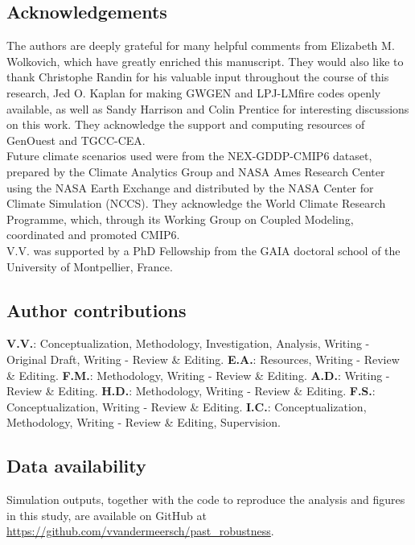 \clearpage

\subsection{Acknowledgements}
The authors are deeply grateful for many helpful comments from Elizabeth M. Wolkovich, which have greatly enriched this manuscript. They would also like to thank Christophe Randin for his valuable input throughout the course of this research, Jed O. Kaplan for making GWGEN and LPJ-LMfire codes openly available, as well as Sandy Harrison and Colin Prentice for interesting discussions on this work. They acknowledge the support and computing resources of GenOuest and TGCC-CEA. \\
Future climate scenarios used were from the NEX-GDDP-CMIP6 dataset, prepared by the Climate Analytics Group and NASA Ames Research Center using the NASA Earth Exchange and distributed by the NASA Center for Climate Simulation (NCCS). They acknowledge the World Climate Research Programme, which, through its Working Group on Coupled Modeling, coordinated and promoted CMIP6. \\
V.V. was supported by a PhD Fellowship from the GAIA doctoral school of the University of Montpellier, France.

\subsection{Author contributions}
\textbf{V.V.}: Conceptualization, Methodology, Investigation, Analysis, Writing - Original Draft, Writing - Review \& Editing. \textbf{E.A.}: Resources, Writing - Review \& Editing. \textbf{F.M.}: Methodology, Writing - Review \& Editing. \textbf{A.D.}: Writing - Review \& Editing. \textbf{H.D.}: Methodology, Writing - Review \& Editing. \textbf{F.S.}: Conceptualization, Writing - Review \& Editing. \textbf{I.C.}:  Conceptualization, Methodology, Writing - Review \& Editing, Supervision.

\subsection{Data availability}
Simulation outputs, together with the code to reproduce the analysis and figures in this study, are available on GitHub at \url{https://github.com/vvandermeersch/past_robustness}.